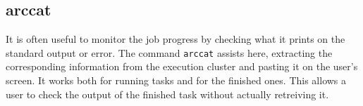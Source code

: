 
\subsection{arccat}
\label{sec:arccat}

It is often useful to monitor the job progress by checking what it
prints on the standard output or error. The command \texttt{arccat}
 assists here, extracting the
corresponding information from the execution cluster and pasting it
on the user's screen. It works both for running tasks and for the
finished ones. This allows a user to check the output of the
finished task without actually retreiving it.

